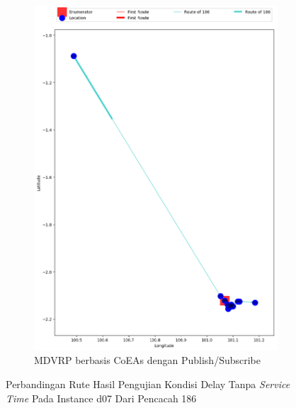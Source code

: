 \begin{figure}[H]\ContinuedFloat
	\centering
	\begin{subfigure}[t]{\textwidth}
		\centering
		\includegraphics[width=\textwidth]{Resources/Images/delayed_7/real_m15_n100_delayed_7_186_pubsub_coes}
		\caption{MDVRP berbasis CoEAs dengan Publish/Subscribe}
		\label{fig:real_m15_n100_delayed_7_186_pubsub_coes}
	\end{subfigure}
	\caption{Perbandingan Rute Hasil Pengujian Kondisi Delay Tanpa \textit{Service Time} Pada Instance d07 Dari Pencacah 186}
	\label{fig:real_m15_n100_delayed_7_186_contd}
\end{figure}


